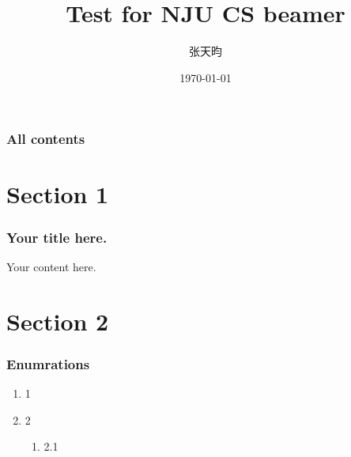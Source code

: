 \documentclass[xcolor=dvipsnames]{beamer}
\title{Test for NJU CS beamer}
\author[Tianyun Zhang]{张天昀}
\institute[CS@NJU]{南京大学计算机科学与技术系\\ 171860508@smail.nju.edu.cn}
\date{\today}
\begin{document}
\begin{frame}
  \maketitle
\end{frame}

\begin{frame}
  \frametitle{All contents}
  \tableofcontents
\end{frame}

\section{Section 1}
\begin{frame}
	\frametitle{Your title here.}
  	Your content here.
\end{frame}

\section{Section 2}
\begin{frame}
	\frametitle{Enumrations}
	\begin{enumerate}
		\item 1
		\item 2
		\begin{enumerate}
			\item 2.1
		\end{enumerate}
	\end{enumerate}
\end{frame}
\end{document}
